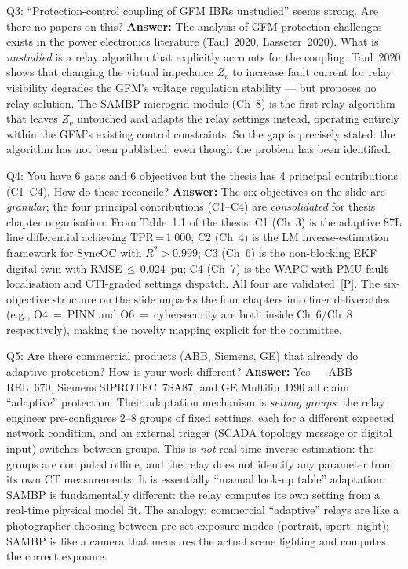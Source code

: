 \documentclass[12pt,a4paper]{article}
\begin{document}
\begin{keybox}{Q3: ``Protection-control coupling of GFM IBRs unstudied'' seems strong. Are there no papers on this?}
\textbf{Answer:}  The analysis of GFM protection challenges exists in the power
electronics literature (Taul~2020, Lasseter~2020).  What is \emph{unstudied} is a
relay algorithm that explicitly accounts for the coupling.  Taul~2020 shows that
changing the virtual impedance $Z_v$ to increase fault current for relay visibility
degrades the GFM's voltage regulation stability --- but proposes no relay solution.
The SAMBP microgrid module (Ch~8) is the first relay algorithm that leaves $Z_v$
untouched and adapts the relay settings instead, operating entirely within the GFM's
existing control constraints.  So the gap is precisely stated: the algorithm has not
been published, even though the problem has been identified.
\end{keybox}

\begin{keybox}{Q4: You have 6 gaps and 6 objectives but the thesis has 4 principal contributions (C1--C4). How do these reconcile?}
\textbf{Answer:}  The six objectives on the slide are \emph{granular}; the four
principal contributions (C1--C4) are \emph{consolidated} for thesis chapter organisation:
From Table~1.1 of the thesis: C1 (Ch~3) is the adaptive 87L line differential achieving
TPR\,=\,1.000; C2 (Ch~4) is the LM inverse-estimation framework for SyncOC with
$R^2>0.999$; C3 (Ch~6) is the non-blocking EKF digital twin with RMSE\,$\leq$\,0.024~pu;
C4 (Ch~7) is the WAPC with PMU fault localisation and CTI-graded settings dispatch.
All four are validated~[P].  The six-objective structure on the slide unpacks the
four chapters into finer deliverables (e.g., O4~=~PINN and O6~=~cybersecurity are both
inside Ch~6/Ch~8 respectively), making the novelty mapping explicit for the committee.
\end{keybox}

\begin{keybox}{Q5: Are there commercial products (ABB, Siemens, GE) that already do adaptive protection? How is your work different?}
\textbf{Answer:}  Yes --- ABB REL~670, Siemens SIPROTEC~7SA87, and GE Multilin~D90
all claim ``adaptive'' protection.  Their adaptation mechanism is \emph{setting groups}:
the relay engineer pre-configures 2--8 groups of fixed settings, each for a different
expected network condition, and an external trigger (SCADA topology message or digital
input) switches between groups.  This is \emph{not} real-time inverse estimation: the
groups are computed offline, and the relay does not identify any parameter from its
own CT measurements.  It is essentially ``manual look-up table'' adaptation.  SAMBP
is fundamentally different: the relay computes its own setting from a real-time
physical model fit.  The analogy: commercial ``adaptive'' relays are like a photographer
choosing between pre-set exposure modes (portrait, sport, night); SAMBP is like a
camera that measures the actual scene lighting and computes the correct exposure.
\end{keybox}
\end{document}
